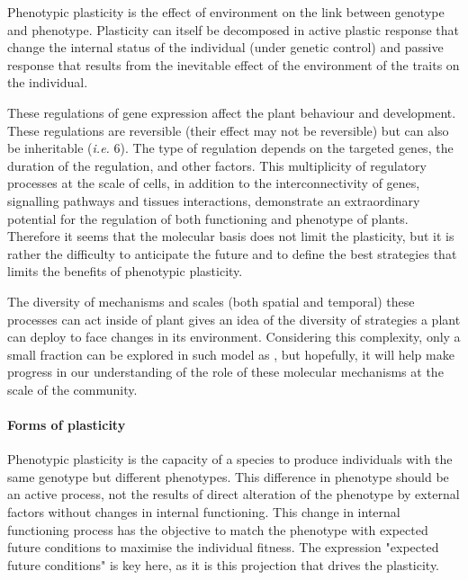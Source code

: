 \begin{fullwidth}
\begin{tcolorbox}[title=Box 1: Molecular basis of phenotypic plasticity]
{\footnotesize     Phenotypic plasticity is the effect of environment on the link between genotype and phenotype. Plasticity can itself be decomposed in active plastic response that change the internal status of the individual (under genetic control) and passive response that results from the inevitable effect of the environment of the traits on the individual.}
   
   \label{fig:plasticity_form}

These regulations of gene expression affect the plant behaviour and development. These regulations are reversible (their effect may not be reversible) but can also be inheritable (\textit{i.e.} 6). The type of regulation depends on the targeted genes, the duration of the regulation, and other factors. This multiplicity of regulatory processes at the scale of cells, in addition to the interconnectivity of genes, signalling pathways and tissues interactions, demonstrate an extraordinary potential for the regulation of both functioning and phenotype of plants. Therefore it seems that the molecular basis does not limit the plasticity, but it is rather the difficulty to anticipate the future and to define the best strategies that limits the benefits of phenotypic plasticity.

The diversity of mechanisms and scales (both spatial and temporal) these processes can act inside of plant gives an idea of the diversity of strategies a plant can deploy to face changes in its environment. Considering this complexity, only a small fraction can be explored in such model as \model, but hopefully, it will help make progress in our understanding of the role of these molecular mechanisms at the scale of the community.
\end{tcolorbox}
\end{fullwidth}






\paragraph{Forms of plasticity}
Phenotypic plasticity is the capacity of a species to produce individuals with the same genotype but different phenotypes. This difference in phenotype should be an active process, not the results of direct alteration of the phenotype by external factors without changes in internal functioning. This change in internal functioning process has the objective  to match the phenotype with expected future conditions to maximise the individual fitness. The expression "expected future conditions" is key here, as it is this projection that drives the plasticity.


